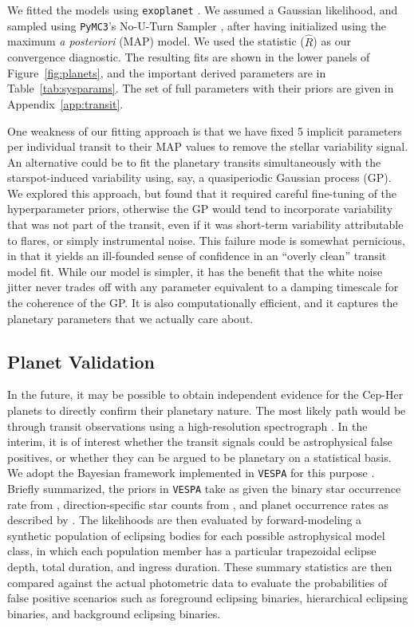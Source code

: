 \documentclass[12pt,twocolumn,linenumbers]{aastex63}
\begin{document}
We fitted the models using \texttt{exoplanet}
\citep{exoplanet:exoplanet}.  We assumed a Gaussian likelihood, and
sampled using \texttt{PyMC3}'s No-U-Turn Sampler
\citep{hoffman_no-u-turn_2014}, after having initialized using the
maximum {\it a posteriori} (MAP) model.  We used the
\citet{gelman_inference_1992} statistic ($\hat{R}$) as our convergence
diagnostic.  The resulting fits are shown in the lower panels of
Figure~\ref{fig:planets}, and the important derived parameters are in
Table~\ref{tab:sysparams}.  The set of full parameters with their
priors are given in Appendix~\ref{app:transit}.

One weakness of our fitting approach is that we have fixed 5 implicit
parameters per individual transit to their MAP values to remove the
stellar variability signal.  An alternative could be to fit the
planetary transits simultaneously with the starspot-induced
variability using, say, a quasiperiodic Gaussian process (GP).  We
explored this approach, but found that it required careful fine-tuning
of the hyperparameter priors, otherwise the GP would tend to
incorporate variability that was not part of the transit, even if it was
short-term variability attributable to flares, or simply
instrumental noise.  This failure mode is somewhat pernicious, in that
it yields an ill-founded sense of confidence in an ``overly clean''
transit model fit.  While our model is simpler, it has the benefit
that the white noise jitter never trades off with any parameter
equivalent to a damping timescale for the coherence of the GP.  It is
also computationally efficient, and it captures the planetary
parameters that we actually care about.


\subsection{Planet Validation}

In the future, it may be possible to obtain independent evidence for
the Cep-Her planets to directly confirm their planetary nature.  The
most likely path would be through transit observations using a
high-resolution spectrograph \citep[see][]{bouma_kep1627_2022}.  In
the interim, it is of interest whether the transit signals could be
astrophysical false positives, or whether they can be argued to be
planetary on a statistical basis.  We adopt the Bayesian framework
implemented in \texttt{VESPA} for this purpose
\citep{morton_efficient_2012,vespa_2015}.  Briefly summarized, the
priors in \texttt{VESPA} take as given the binary star occurrence rate
from \citet{raghavan_survey_2010}, direction-specific star counts from
\citet{girardi_star_2005}, and planet occurrence rates as described by
\citet[][Section~3.4]{morton_efficient_2012}.  The likelihoods are
then evaluated by forward-modeling a synthetic population of eclipsing
bodies for each possible astrophysical model class, in which each
population member has a particular trapezoidal eclipse depth, total
duration, and ingress duration.  These summary statistics are then
compared against the actual photometric data to evaluate the
probabilities of false positive scenarios such as foreground eclipsing
binaries, hierarchical eclipsing binaries, and background eclipsing
binaries.
\end{document}

